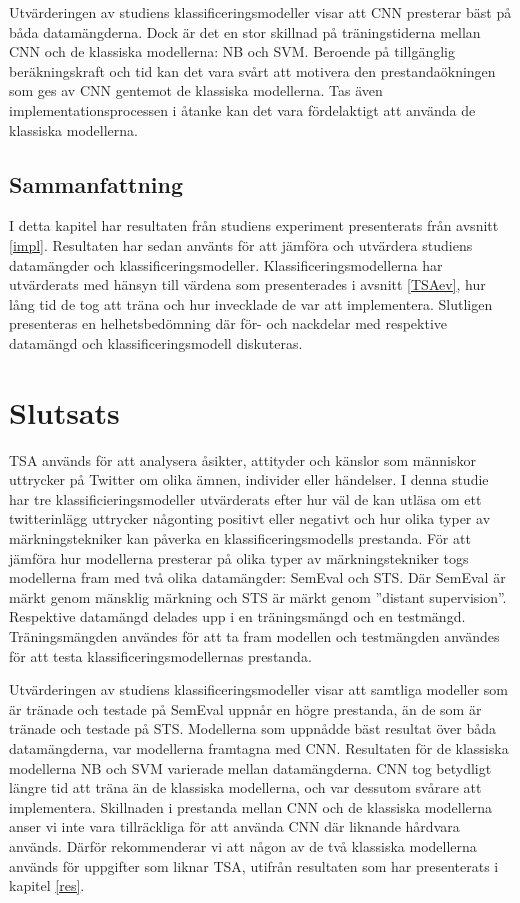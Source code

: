 \documentclass{kaumasters} %
\begin{document}
Utvärderingen av studiens klassificeringsmodeller visar att CNN presterar bäst på båda datamängderna. Dock är det en stor skillnad på träningstiderna mellan CNN och de klassiska modellerna: NB och SVM. Beroende på tillgänglig beräkningskraft och tid kan det vara svårt att motivera den prestandaökningen som ges av CNN gentemot de klassiska modellerna. Tas även implementationsprocessen i åtanke kan det vara fördelaktigt att använda de klassiska modellerna.
\section{Sammanfattning}
I detta kapitel har resultaten från studiens experiment presenterats från avsnitt \ref{impl}. Resultaten har sedan använts för att jämföra och utvärdera studiens datamängder och klassificeringsmodeller. Klassificeringsmodellerna har utvärderats med hänsyn till värdena som presenterades i avsnitt \ref{TSAev}, hur lång tid de tog att träna och hur invecklade de var att implementera. Slutligen presenteras en helhetsbedömning där för- och nackdelar med respektive datamängd och klassificeringsmodell diskuteras.

\chapter{Slutsats}
TSA används för att analysera åsikter, attityder och känslor som människor uttrycker på Twitter om olika ämnen, individer eller händelser. I denna studie har tre klassificieringsmodeller utvärderats efter hur väl de kan utläsa om ett twitterinlägg uttrycker någonting positivt eller negativt och hur olika typer av märkningstekniker kan påverka en klassificeringsmodells prestanda. För att jämföra hur modellerna presterar på olika typer av märkningstekniker togs modellerna fram med två olika datamängder: SemEval och STS. Där SemEval är märkt genom mänsklig märkning och STS är märkt genom ''distant supervision''. Respektive datamängd delades upp i en träningsmängd och en testmängd. Träningsmängden användes för att ta fram modellen och testmängden användes för att testa klassificeringsmodellernas prestanda. 

Utvärderingen av studiens klassificeringsmodeller visar att samtliga modeller som är tränade och testade på SemEval uppnår en högre prestanda, än de som är tränade och testade på STS. Modellerna som uppnådde bäst resultat över båda datamängderna, var modellerna framtagna med CNN. Resultaten för de klassiska modellerna NB och SVM varierade mellan datamängderna. CNN tog betydligt längre tid att träna än de klassiska modellerna, och var dessutom svårare att implementera. Skillnaden i prestanda mellan CNN och de klassiska modellerna anser vi inte vara tillräckliga för att använda CNN där liknande hårdvara används. Därför rekommenderar vi att någon av de två klassiska modellerna används för uppgifter som liknar TSA, utifrån resultaten som har presenterats i kapitel \ref{res}.
\end{document}
